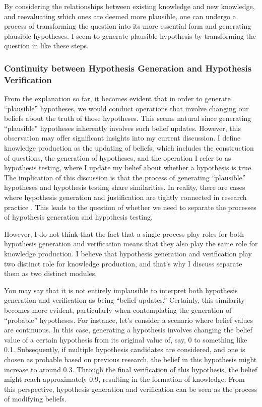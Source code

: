 \documentclass{article}
\begin{document}

By considering the relationships between existing knowledge and new knowledge, and reevaluating which ones are deemed more plausible, one can undergo a process of transforming the question into its more essential form and generating plausible hypotheses. I seem to generate plausible hypothesis by transforming the question in like these steps.

\subsubsection{Continuity between Hypothesis Generation and Hypothesis Verification}

From the explanation so far, it becomes evident that in order to generate ``plausible'' hypotheses, we would conduct operations that involve changing our beliefs about the truth of those hypotheses. This seems natural since generating ``plausible'' hypotheses inherently involves such belief updates. However, this observation may offer significant insights into my current discussion. I define knowledge production as the updating of beliefs, which includes the construction of questions, the generation of hypotheses, and the operation I refer to as hypothesis testing, where I update my belief about whether a hypothesis is true. The implication of this discussion is that the process of generating ``plausible'' hypotheses and hypothesis testing share similarities. In reality, there are cases where hypothesis generation and justification are tightly connected in research practice \cite{arabatzis2006inextricability}. This leads to the question of whether we need to separate the processes of hypothesis generation and hypothesis testing.

However, I do not think that the fact that a single process play roles for both hypothesis generation and verification means that they also play the same role for knowledge production. I believe that hypothesis generation and verification play two distinct role for knowledge production, and that's why I discuss separate them as two distinct modules.

You may say that it is not entirely implausible to interpret both hypothesis generation and verification as being ``belief updates.'' Certainly, this similarity becomes more evident, particularly when contemplating the generation of ``probable'' hypotheses. For instance, let's consider a scenario where belief values are continuous. In this case, generating a hypothesis involves changing the belief value of a certain hypothesis from its original value of, say, 0 to something like 0.1. Subsequently, if multiple hypothesis candidates are considered, and one is chosen as probable based on previous research, the belief in this hypothesis might increase to around 0.3. Through the final verification of this hypothesis, the belief might reach approximately 0.9, resulting in the formation of knowledge. From this perspective, hypothesis generation and verification can be seen as the process of modifying beliefs.
\end{document}
